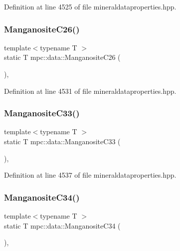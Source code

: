 Definition at line 4525 of file mineraldataproperties.\+hpp.

\mbox{\label{namespacempc_1_1data_a47184401119087dae6461d40bb5f69d1}} 
\subsubsection{\texorpdfstring{Manganosite\+C26()}{ManganositeC26()}}
{\footnotesize\ttfamily template$<$typename T $>$ \\
static T mpc\+::data\+::\+Manganosite\+C26 (\begin{DoxyParamCaption}{ }\end{DoxyParamCaption})\hspace{0.3cm}{\ttfamily [inline]}, {\ttfamily [static]}}



Definition at line 4531 of file mineraldataproperties.\+hpp.

\mbox{\label{namespacempc_1_1data_ac8f599743cf35d4b07de390e0d6007fa}} 
\subsubsection{\texorpdfstring{Manganosite\+C33()}{ManganositeC33()}}
{\footnotesize\ttfamily template$<$typename T $>$ \\
static T mpc\+::data\+::\+Manganosite\+C33 (\begin{DoxyParamCaption}{ }\end{DoxyParamCaption})\hspace{0.3cm}{\ttfamily [inline]}, {\ttfamily [static]}}



Definition at line 4537 of file mineraldataproperties.\+hpp.

\mbox{\label{namespacempc_1_1data_af1609df984183ea6236ee3094e65ae46}} 
\subsubsection{\texorpdfstring{Manganosite\+C34()}{ManganositeC34()}}
{\footnotesize\ttfamily template$<$typename T $>$ \\
static T mpc\+::data\+::\+Manganosite\+C34 (\begin{DoxyParamCaption}{ }\end{DoxyParamCaption})\hspace{0.3cm}{\ttfamily [inline]}, {\ttfamily [static]}}



